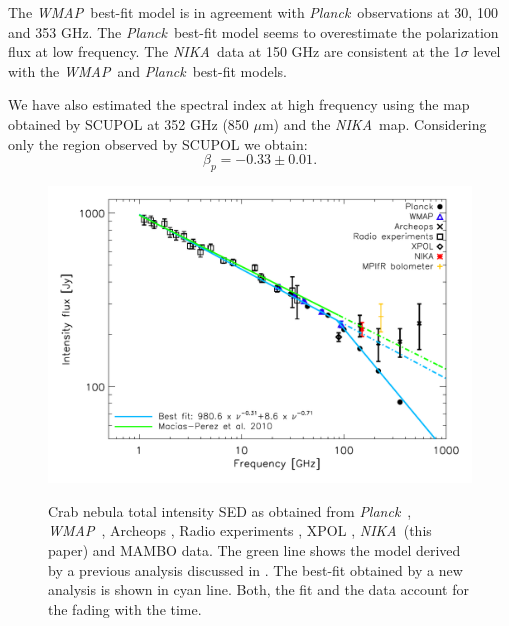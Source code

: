 \documentclass[twocolumn,traditabstract]{aa}
\def\NIKA{\textit{NIKA}}
\def\Planck{\textit{Planck}}
\def\WMAP{\textit{WMAP}}
\begin{document}
The \WMAP\ best-fit model is in agreement with \Planck\ observations at 30, 100 and 353 GHz.
The \Planck\ best-fit model seems to overestimate the polarization flux at low frequency. 
The \NIKA\ data at 150 GHz are consistent at the 1$\sigma$ level with the \WMAP\ and \Planck\ best-fit models.

We have also estimated the spectral index at high frequency using the map obtained by SCUPOL at 352 GHz (850 $\mu$m) and the \NIKA\ map. Considering only the region observed by SCUPOL we obtain:
\begin{equation}
\beta_p = -0.33 \pm 0.01.
\end{equation}

\begin{figure}
  \centering
          { \includegraphics[width=1\linewidth,keepaspectratio]{figures/Crab_SED_i_150.pdf}}
           \caption{Crab nebula total intensity SED as obtained from \Planck\ \citep{2015arXiv150702058P}, \WMAP\ \citep{2011ApJS..192...19W}, Archeops \citep{macias2007archeops}, Radio experiments \citep{dmitrenko1970absolute, 1971IzVUZ..14..157V}, XPOL \citep{aumont2010}, \NIKA\ (this paper) and MAMBO \citep{2002A&A...386.1044B} data. The green line shows the model derived by a previous analysis discussed in \citep{macias2010}. The best-fit obtained by a new analysis is shown in cyan line. Both, the fit and the data account for the fading with the time.}
\label{crab_SED}		
  \end{figure} 
\end{document}
